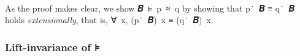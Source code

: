 \begin{code}
%
\>[30]\AgdaSymbol{)}\AgdaSpace{}%
\AgdaSpace{}%
\AgdaSpace{}%
\AgdaSpace{}%
\AgdaBound{-}\AgdaSpace{}%
\AgdaSpace{}%
\AgdaSymbol{(}\AgdaSpace{}%
\AgdaSpace{}%
\AgdaSymbol{)}\AgdaSpace{}%
\AgdaBound{-}\AgdaSymbol{)}\AgdaSpace{}%
\AgdaSymbol{(}\AgdaSpace{}%
\AgdaSpace{}%
\AgdaSpace{}%
\AgdaSpace{}%
\AgdaSymbol{(}\AgdaSymbol{)}\AgdaSpace{}%
\AgdaSymbol{(}\AgdaSpace{}%
\AgdaSymbol{))}\AgdaSpace{}%
\<%
\\
%
\>[2]\AgdaSymbol{(}\AgdaSpace{}%
\AgdaSpace{}%
\AgdaSymbol{)}\AgdaSpace{}%
%
\>[33]\<%
\end{code}
\ccpad
As the proof makes clear, we show \ab 𝑩~\af ⊧~\ab p~\af ≈~\ab q by showing that \ab p~\af ̇~\ab 𝑩 \ad ≡ \ab q~\af ̇~\ab 𝑩 holds \emph{extensionally}, that is, \as ∀~\ab x, (\ab p~\af ̇~\ab 𝑩)~\ab x \ad ≡ (\ab q~\af ̇~\ab 𝑩)~\ab x.

\subsubsection{Lift-invariance of ⊧}\label{lift-invariance-of}

